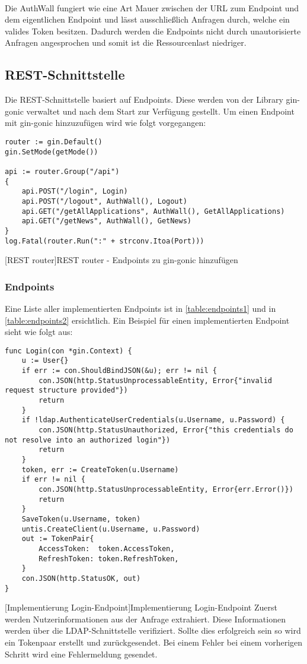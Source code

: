 ~\\
Die AuthWall fungiert wie eine Art Mauer zwischen der URL zum Endpoint und dem eigentlichen Endpoint und lässt ausschließlich Anfragen durch, welche ein valides Token besitzen. \cite{tokenmanager} Dadurch werden die Endpoints nicht durch unautorisierte Anfragen angesprochen und somit ist die Ressourcenlast niedriger.

\newpage

\subsection{REST-Schnittstelle}
Die REST-Schnittstelle basiert auf Endpoints. Diese werden von der Library gin-gonic verwaltet und nach dem Start zur Verfügung gestellt. \cite{gingonic} Um einen Endpoint mit gin-gonic hinzuzufügen wird wie folgt vorgegangen:

\begin{verbatim}
router := gin.Default()
gin.SetMode(getMode())

api := router.Group("/api")
{
	api.POST("/login", Login)
	api.POST("/logout", AuthWall(), Logout)
	api.GET("/getAllApplications", AuthWall(), GetAllApplications)
	api.GET("/getNews", AuthWall(), GetNews)
}
log.Fatal(router.Run(":" + strconv.Itoa(Port)))
\end{verbatim} 
[REST router]{REST router - Endpoints zu gin-gonic hinzufügen}

\subsubsection{Endpoints}

Eine Liste aller implementierten Endpoints ist in \autoref{table:endpoints1} und in \autoref{table:endpoints2} ersichtlich. Ein Beispiel für einen implementierten Endpoint sieht wie folgt aus:

\begin{verbatim}
func Login(con *gin.Context) {
	u := User{}
	if err := con.ShouldBindJSON(&u); err != nil {
		con.JSON(http.StatusUnprocessableEntity, Error{"invalid request structure provided"})
		return
	}
	if !ldap.AuthenticateUserCredentials(u.Username, u.Password) {
		con.JSON(http.StatusUnauthorized, Error{"this credentials do not resolve into an authorized login"})
		return
	}
	token, err := CreateToken(u.Username)
	if err != nil {
		con.JSON(http.StatusUnprocessableEntity, Error{err.Error()})
		return
	}
	SaveToken(u.Username, token)
	untis.CreateClient(u.Username, u.Password)
	out := TokenPair{
		AccessToken:  token.AccessToken,
		RefreshToken: token.RefreshToken,
	}
	con.JSON(http.StatusOK, out)
}
\end{verbatim}
[Implementierung Login-Endpoint]{Implementierung Login-Endpoint}
Zuerst werden Nutzerinformationen aus der Anfrage extrahiert. Diese Informationen werden über die LDAP-Schnittstelle verifiziert. Sollte dies erfolgreich sein so wird ein Tokenpaar erstellt und zurückgesendet. Bei einem Fehler bei einem vorherigen Schritt wird eine Fehlermeldung gesendet.

